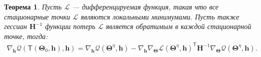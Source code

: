 \documentclass[12pt, twoside]{article}
\newtheorem{theorem}{Теорема}
\begin{document}
\begin{theorem}
Пусть $\mathcal{L}$ --- дифференцируемая функция, такая что все стационарные точки $\mathcal{L}$ являются локальными минимумами. Пусть также гессиан $\mathbf{H}^{-1}$ функции потерь $\mathcal{L}$ является обратимым в каждой стационарной точке, тогда:
\begin{equation}
\label{eq:1}
\begin{aligned}
    \nabla_{\mathbf{h}}\mathcal{Q}\left(\mathsf{T}\left(\bm{\Theta}_{0}, \mathbf{h}\right), \mathbf{h}\right) = \nabla_{\mathbf{h}}\mathcal{Q}\left(\bm{\Theta}^{\eta}, \mathbf{h}\right) -   \nabla_{\mathbf{h}}\nabla_{\bm{\Theta}}\mathcal{L}\left(\bm{\Theta}^{\eta}, \mathbf{h}\right)^{\mathsf{T}}\mathbf{H}^{-1}\nabla_{\bm{\Theta}}\mathcal{Q}\left(\bm{\Theta}^{\eta}, \mathbf{h}\right).
\end{aligned}
\end{equation}
\end{theorem}
\end{document}
